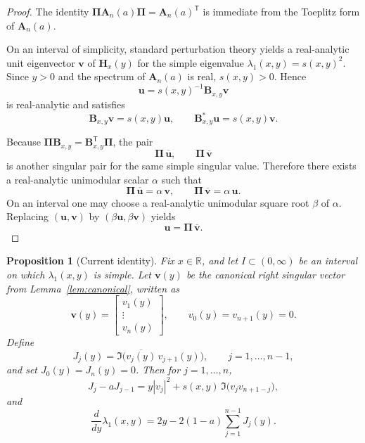 \documentclass[11pt]{article}
\numberwithin{equation}{section}
\newtheorem{proposition}[theorem]{Proposition}
\begin{document}
\begin{proof}
The identity $\bm{\Pi}\mathbf A_n(a)\bm{\Pi}=\mathbf A_n(a)^{\mathsf T}$ is
immediate from the Toeplitz form of $\mathbf A_n(a)$.

On an interval of simplicity, standard perturbation theory yields a
real-analytic unit eigenvector $\bm v$ of $\mathbf H_x(y)$ for the simple
eigenvalue $\lambda_1(x,y)=s(x,y)^2$.  Since $y>0$ and the spectrum of
$\mathbf A_n(a)$ is real, $s(x,y)>0$.  Hence
\[
\bm u=s(x,y)^{-1}\mathbf B_{x,y}\bm v
\]
is real-analytic and satisfies
\[
\mathbf B_{x,y}\bm v=s(x,y)\bm u,
\qquad
\mathbf B_{x,y}^*\bm u=s(x,y)\bm v.
\]

Because $\bm{\Pi}\mathbf B_{x,y}=\mathbf B_{x,y}^{\mathsf T}\bm{\Pi}$,
the pair
\[
\bm{\Pi}\,\overline{\bm u},
\qquad
\bm{\Pi}\,\overline{\bm v}
\]
is another singular pair for the same simple singular value.  Therefore there
exists a real-analytic unimodular scalar $\alpha$ such that
\[
\bm{\Pi}\,\overline{\bm u}=\alpha\,\bm v,
\qquad
\bm{\Pi}\,\overline{\bm v}=\alpha\,\bm u.
\]
On an interval one may choose a real-analytic unimodular square root
$\beta$ of $\alpha$.  Replacing $(\bm u,\bm v)$ by
$(\beta\bm u,\beta\bm v)$ yields
\[
\bm u=\bm{\Pi}\,\overline{\bm v}.
\]
\end{proof}

\begin{proposition}[Current identity]\label{prop:current}
Fix $x\in\mathbb{R}$, and let $I\subset(0,\infty)$ be an interval on which
$\lambda_1(x,y)$ is simple.  Let $\bm v(y)$ be the canonical right singular
vector from Lemma~\ref{lem:canonical}, written as
\[
\bm v(y)=
\begin{bmatrix}
v_1(y)\\
\vdots\\
v_n(y)
\end{bmatrix},
\qquad
v_0(y)=v_{n+1}(y)=0.
\]
Define
\[
J_j(y)=\Im\!\bigl(\overline{v_j(y)}\,v_{j+1}(y)\bigr),
\qquad
j=1,\dots,n-1,
\]
and set $J_0(y)=J_n(y)=0$.  Then for $j=1,\dots,n$,
\begin{equation}\label{eq:current}
J_j-aJ_{j-1}
=
y|v_j|^2+s(x,y)\,\Im\!\bigl(v_jv_{n+1-j}\bigr),
\end{equation}
and
\begin{equation}\label{eq:lambda-derivative}
\frac{d}{dy}\lambda_1(x,y)
=
2y-2(1-a)\sum_{j=1}^{n-1}J_j(y).
\end{equation}
\end{proposition}
\end{document}
